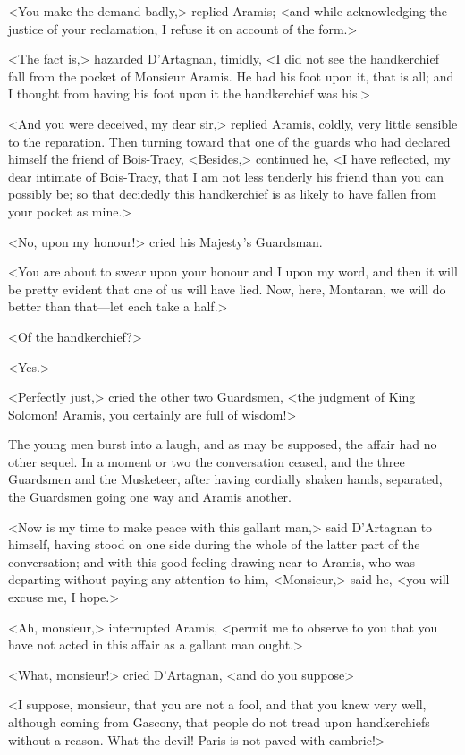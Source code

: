 <You make the demand badly,> replied Aramis; <and while acknowledging the justice of your reclamation, I refuse it on account of the form.> 

<The fact is,> hazarded D'Artagnan, timidly, <I did not see the handkerchief fall from the pocket of Monsieur Aramis. He had his foot upon it, that is all; and I thought from having his foot upon it the handkerchief was his.> 

<And you were deceived, my dear sir,> replied Aramis, coldly, very little sensible to the reparation. Then turning toward that one of the guards who had declared himself the friend of Bois-Tracy, <Besides,> continued he, <I have reflected, my dear intimate of Bois-Tracy, that I am not less tenderly his friend than you can possibly be; so that decidedly this handkerchief is as likely to have fallen from your pocket as mine.> 

<No, upon my honour!> cried his Majesty's Guardsman. 

<You are about to swear upon your honour and I upon my word, and then it will be pretty evident that one of us will have lied. Now, here, Montaran, we will do better than that—let each take a half.> 

<Of the handkerchief?> 

<Yes.> 

<Perfectly just,> cried the other two Guardsmen, <the judgment of King Solomon! Aramis, you certainly are full of wisdom!> 

The young men burst into a laugh, and as may be supposed, the affair had no other sequel. In a moment or two the conversation ceased, and the three Guardsmen and the Musketeer, after having cordially shaken hands, separated, the Guardsmen going one way and Aramis another. 

<Now is my time to make peace with this gallant man,> said D'Artagnan to himself, having stood on one side during the whole of the latter part of the conversation; and with this good feeling drawing near to Aramis, who was departing without paying any attention to him, <Monsieur,> said he, <you will excuse me, I hope.> 

<Ah, monsieur,> interrupted Aramis, <permit me to observe to you that you have not acted in this affair as a gallant man ought.> 

<What, monsieur!> cried D'Artagnan, <and do you suppose\longdash> 

<I suppose, monsieur, that you are not a fool, and that you knew very well, although coming from Gascony, that people do not tread upon handkerchiefs without a reason. What the devil! Paris is not paved with cambric!> 

